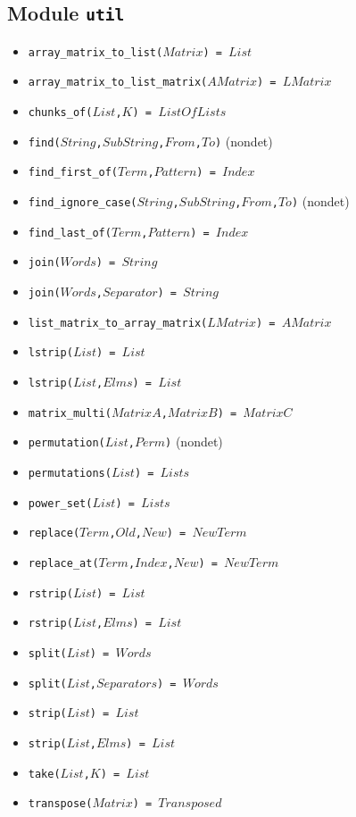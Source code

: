 \documentclass[10pt]{article}
\newcommand{\ignore}[1]{}
\begin{document}
\begin{multicols}{2}
\section*{Module \texttt{util}}
\begin{scriptsize}
\begin{itemize}
    \item \texttt{array\_matrix\_to\_list($Matrix$) = $List$}
    \item \texttt{array\_matrix\_to\_list\_matrix($AMatrix$) = $LMatrix$}
    \item \texttt{chunks\_of($List$,$K$) = $ListOfLists$}
    \item \texttt{find($String$,$SubString$,$From$,$To$)} (nondet)
    \item \texttt{find\_first\_of($Term$,$Pattern$) = $Index$}
    \item \texttt{find\_ignore\_case($String$,$SubString$,$From$,$To$)} (nondet)
    \item \texttt{find\_last\_of($Term$,$Pattern$) = $Index$}
    \item \texttt{join($Words$) = $String$}
    \item \texttt{join($Words$,$Separator$) = $String$}
    \item \texttt{list\_matrix\_to\_array\_matrix($LMatrix$) = $AMatrix$}
    \item \texttt{lstrip($List$) = $List$ }
    \item \texttt{lstrip($List$,$Elms$) = $List$ }
    \item \texttt{matrix\_multi($MatrixA$,$MatrixB$) = $MatrixC$}
    \item \texttt{permutation($List$,$Perm$)} (nondet)
    \item \texttt{permutations($List$) = $Lists$}
    \item \texttt{power\_set($List$) = $Lists$}
    \item \texttt{replace($Term$,$Old$,$New$) = $NewTerm$}
    \item \texttt{replace\_at($Term$,$Index$,$New$) = $NewTerm$}
    \item \texttt{rstrip($List$) = $List$ }
    \item \texttt{rstrip($List$,$Elms$) = $List$ }
    \item \texttt{split($List$) = $Words$ }
    \item \texttt{split($List$,$Separators$) = $Words$ }
    \item \texttt{strip($List$) = $List$ }
    \item \texttt{strip($List$,$Elms$) = $List$ }
    \item \texttt{take($List$,$K$) = $List$}
    \item \texttt{transpose($Matrix$) = $Transposed$}
\end{itemize}
\end{scriptsize}
\ignore{
}
\end{multicols}
\end{document}
